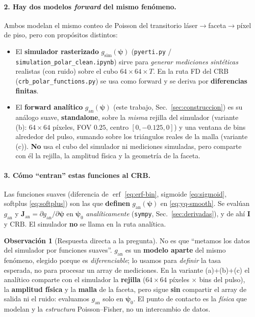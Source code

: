 \documentclass[11pt,a4paper]{article}
\theoremstyle{plain}
\theoremstyle{definition}
\newtheorem{remark}{Observaci\'on}
\newcommand{\vect}[1]{\boldsymbol{#1}}
\newcommand{\matr}[1]{\mathbf{#1}}
\newcommand{\erf}{\operatorname{erf}}
\begin{document}
\paragraph{2. Hay dos modelos \emph{forward} del mismo fen\'omeno.} Ambos modelan
el mismo conteo de Poisson del transitorio l\'aser$\to$faceta$\to$p\'ixel de piso,
pero con prop\'ositos distintos:
\begin{itemize}[nosep]
    \item El \textbf{simulador rasterizado} $g_{\mathrm{sim}}(\vect{\psi})$
    (\texttt{pyerti.py} / \texttt{simulation\_polar\_clean.ipynb}) sirve para
    \emph{generar mediciones sint\'eticas} realistas (con ruido) sobre el cubo
    $64\times64\times T$. En la ruta FD del CRB (\texttt{crb\_polar\_functions.py})
    se usa como forward y se deriva por \textbf{diferencias finitas}.
    \item El \textbf{forward anal\'itico} $g_{\mathrm{an}}(\vect{\psi})$
    (este trabajo, Sec.~\ref{sec:construccion}) es su an\'alogo suave,
    \textbf{standalone}, sobre la \emph{misma} rejilla del simulador (variante
    (b): $64\times64$ p\'ixeles, FOV $0.25$, centro $[0,-0.125,0]$) y una ventana
    de bins alrededor del pulso, sumando sobre los tri\'angulos reales de la malla
    (variante (c)). \textbf{No} usa el cubo del simulador ni mediciones simuladas,
    pero comparte con \'el la rejilla, la amplitud f\'isica y la geometr\'ia de la
    faceta.
\end{itemize}

\paragraph{3. C\'omo ``entran'' estas funciones al CRB.} Las funciones suaves
(diferencia de $\erf$ \eqref{eq:erf-bin}, sigmoide \eqref{eq:sigmoid}, softplus
\eqref{eq:softplus}) son las que \textbf{definen} $g_{\mathrm{an}}(\vect{\psi})$
en \eqref{eq:yq-smooth}. Se eval\'uan $g_{\mathrm{an}}$ y
$\matr J_{\mathrm{an}}=\partial g_{\mathrm{an}}/\partial\vect{\psi}$ en
$\vect{\psi}_0$ \emph{anal\'iticamente} (\texttt{sympy}, Sec.~\ref{sec:derivadas}),
y de ah\'i $\matr I$ y $\mathrm{CRB}$. El simulador \textbf{no} se llama en la ruta
anal\'itica.

\begin{remark}[Respuesta directa a la pregunta]
No es que ``metamos los datos del simulador por funciones suaves''.
$g_{\mathrm{an}}$ es un \textbf{modelo aparte} del mismo fen\'omeno, elegido
porque es \emph{diferenciable}; lo usamos para \emph{definir} la tasa esperada,
no para procesar un array de mediciones. En la variante (a)+(b)+(c) el anal\'itico
comparte con el simulador la \textbf{rejilla} ($64\times64$ p\'ixeles $\times$ bins
del pulso), la \textbf{amplitud f\'isica} y la \textbf{malla} de la faceta, pero
sigue \textbf{sin} compartir el array de salida ni el ruido: evaluamos
$g_{\mathrm{an}}$ solo en $\vect\psi_0$. El punto de contacto es la \emph{f\'isica}
que modelan y la \emph{estructura} Poisson--Fisher, no un intercambio de datos.
\end{remark}
\end{document}
